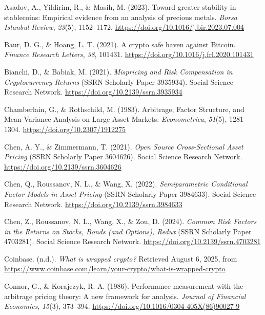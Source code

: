 \documentclass[
  11pt,
  a4paper,
  openany]{scrreprt}
\newlength{\cslhangindent}
\newenvironment{CSLReferences}[2] %
 {\begin{list}{}{%
  \setlength{\itemindent}{0pt}
  \setlength{\leftmargin}{0pt}
  \setlength{\parsep}{0pt}
  \ifodd #1
   \setlength{\leftmargin}{\cslhangindent}
   \setlength{\itemindent}{-1\cslhangindent}
  \fi
  \setlength{\itemsep}{#2\baselineskip}}}
 {\end{list}}
\begin{document}
\label{refs}
\begin{CSLReferences}{1}{0}
Asadov, A., Yildirim, R., \& Masih, M. (2023). Toward greater stability
in stablecoins: Empirical evidence from an analysis of precious metals.
\emph{Borsa Istanbul Review}, \emph{23}(5), 1152--1172.
\url{https://doi.org/10.1016/j.bir.2023.07.004}

Baur, D. G., \& Hoang, L. T. (2021). A crypto safe haven against
Bitcoin. \emph{Finance Research Letters}, \emph{38}, 101431.
\url{https://doi.org/10.1016/j.frl.2020.101431}

Bianchi, D., \& Babiak, M. (2021). \emph{Mispricing and Risk
Compensation in Cryptocurrency Returns} (SSRN Scholarly Paper 3935934).
Social Science Research Network.
\url{https://doi.org/10.2139/ssrn.3935934}

Chamberlain, G., \& Rothschild, M. (1983). Arbitrage, Factor Structure,
and Mean-Variance Analysis on Large Asset Markets. \emph{Econometrica},
\emph{51}(5), 1281--1304. \url{https://doi.org/10.2307/1912275}

Chen, A. Y., \& Zimmermann, T. (2021). \emph{Open Source Cross-Sectional
Asset Pricing} (SSRN Scholarly Paper 3604626). Social Science Research
Network. \url{https://doi.org/10.2139/ssrn.3604626}

Chen, Q., Roussanov, N. L., \& Wang, X. (2022). \emph{Semiparametric
Conditional Factor Models in Asset Pricing} (SSRN Scholarly Paper
3984633). Social Science Research Network.
\url{https://doi.org/10.2139/ssrn.3984633}

Chen, Z., Roussanov, N. L., Wang, X., \& Zou, D. (2024). \emph{Common
Risk Factors in the Returns on Stocks, Bonds (and Options), Redux} (SSRN
Scholarly Paper 4703281). Social Science Research Network.
\url{https://doi.org/10.2139/ssrn.4703281}

Coinbase. (n.d.). \emph{What is wrapped crypto?} Retrieved August 6,
2025, from
\url{https://www.coinbase.com/learn/your-crypto/what-is-wrapped-crypto}

Connor, G., \& Korajczyk, R. A. (1986). Performance measurement with the
arbitrage pricing theory: A new framework for analysis. \emph{Journal of
Financial Economics}, \emph{15}(3), 373--394.
\url{https://doi.org/10.1016/0304-405X(86)90027-9}


\end{CSLReferences}
\end{document}
